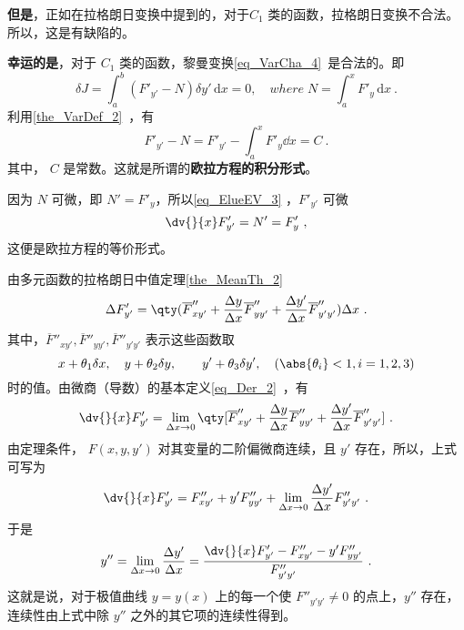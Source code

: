 \textbf{但是}，正如在拉格朗日变换中提到的，对于$C_1$ 类的函数，拉格朗日变换不合法。所以，这是有缺陷的。

\textbf{幸运的是}，对于 $C_1$ 类的函数，黎曼变换\autoref{eq_VarCha_4}~是合法的。即
\begin{equation}
\delta J=\int_a^b \left(F'_{y'}-N \right) \delta y' \,\mathrm{d}{x}=0  ,\quad where \;N=\int_a^xF'_y \,\mathrm{d}{x} ~.
\end{equation}
利用\autoref{the_VarDef_2}~，有
\begin{equation}\label{eq_ElueEV_3}
F'_{y'}-N=F'_{y'}-\int_a^xF'_y\dd x=C~.
\end{equation}
其中， $C$ 是常数。这就是所谓的\textbf{欧拉方程的积分形式}。

因为 $N$ 可微，即 $N'=F'_y$，所以\autoref{eq_ElueEV_3} ，$F'_{y'}$ 可微
\begin{equation}
\dv{}{x}F'_{y'}=N'=F'_y~,
\end{equation}
这便是欧拉方程的等价形式。

由多元函数的拉格朗日中值定理\autoref{the_MeanTh_2}~
\begin{equation}
\Delta F'_{y'}=\qty(\overline{F}''_{xy'}+\frac{\Delta y}{\Delta x}\overline{F}''_{yy'}+\frac{\Delta y'}{\Delta x}\overline{F}''_{y'y'})\Delta x~.
\end{equation}
其中，$\overline{F}''_{xy'},\overline{F}''_{yy'},\overline{F}''_{y'y'}$ 表示这些函数取
\begin{equation}
x+\theta_1\delta x,\quad y+\theta_2\delta y,\quad \quad y'+\theta_3\delta y',\quad (\abs{\theta_i}<1,i=1,2,3)
\end{equation}
时的值。由微商（导数）的基本定义\autoref{eq_Der_2}~，有
\begin{equation}
\dv{}{x}F'_{y'}=\lim_{\Delta x\rightarrow 0}\qty[\overline{F}''_{xy'}+\frac{\Delta y}{\Delta x}\overline{F}''_{yy'}+\frac{\Delta y'}{\Delta x}\overline{F}''_{y'y'}]~.
\end{equation}
由定理条件， $F(x,y,y')$ 对其变量的二阶偏微商连续，且 $y'$ 存在，所以，上式可写为
\begin{equation}
\dv{}{x}F'_{y'}=F''_{xy'}+y'F''_{yy'}+\lim_{\Delta x\rightarrow0}\frac{\Delta y'}{\Delta x}F''_{y'y'}~.
\end{equation}
于是
\begin{equation}
y''=\lim_{\Delta x\rightarrow0}\frac{\Delta y'}{\Delta x}=\frac{\dv{}{x}F'_{y'}-F''_{xy'}-y'F''_{yy'}}{F''_{y'y'}}~.
\end{equation}
这就是说，对于极值曲线 $y=y(x)$ 上的每一个使 $F''_{y'y'}\neq0$ 的点上，$y''$ 存在，连续性由上式中除 $y''$ 之外的其它项的连续性得到。